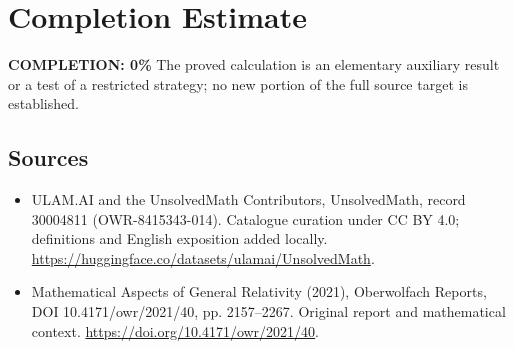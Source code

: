 \documentclass[11pt]{article}
\begin{document}
\section{Completion Estimate}
\noindent\textbf{COMPLETION: 0\%}
The proved calculation is an elementary auxiliary result or a test of a restricted strategy; no new portion of the full source target is established.

\subsection{Sources}
\begin{itemize}
\item[\hypertarget{source:30004811:1}{S1}] ULAM.AI and the UnsolvedMath Contributors, UnsolvedMath, record 30004811 (OWR-8415343-014). Catalogue curation under CC BY 4.0; definitions and English exposition added locally.
\url{https://huggingface.co/datasets/ulamai/UnsolvedMath}.
\item[\hypertarget{source:30004811:2}{S2}] Mathematical Aspects of General Relativity (2021), Oberwolfach Reports, DOI 10.4171/owr/2021/40, pp. 2157--2267. Original report and mathematical context.
\url{https://doi.org/10.4171/owr/2021/40}.
\end{itemize}
\label{end:30004811}
\end{document}
